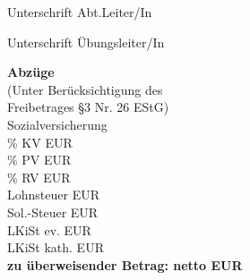 \documentclass[a4paper,10pt,BCOR=0mm]{scrreprt}
\begin{document}
\begin{center}
\parbox{6cm}{
\vspace{9mm}
\begin{center}
Unterschrift Abt.Leiter/In
\end{center}
\vspace{9mm}
\begin{center}
Unterschrift Übungsleiter/In
\end{center}
}
\hfill
\parbox{0.45\textwidth }{
\begin{small}\textbf{Abzüge}\hfill \hspace*{2cm}\\
(Unter Berücksichtigung des\hfill \hspace*{2cm}\\
Freibetrages \S 3 Nr. 26 EStG)\hfill \hspace*{2cm}\\
\hspace*{2cm} Sozialversicherung \hfill \hspace*{2cm}\\
\hspace*{2cm} \% KV \hfill  EUR \hspace*{2cm} \\
\hspace*{2cm} \% PV \hfill  EUR \hspace*{2cm} \\
\hspace*{2cm} \% RV \hfill  EUR \hspace*{2cm} \\
Lohnsteuer  \hfill \hfill EUR \hspace*{2cm} \\
Sol.-Steuer  \hfill \hfill EUR \hspace*{2cm} \\
LKiSt ev. \hfill \hfill EUR \hspace*{2cm} \\
LKiSt kath. \hfill \hfill EUR \hspace*{2cm} \\
\hfill*\textbf{zu überweisender Betrag: netto EUR} \hspace*{2cm}\\
\end{small}}
\end{center}
\end{document}
